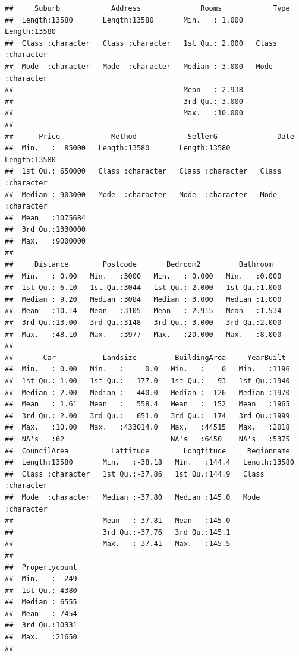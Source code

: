 \documentclass[
]{article}
\begin{document}
\begin{verbatim}
##     Suburb            Address              Rooms            Type          
##  Length:13580       Length:13580       Min.   : 1.000   Length:13580      
##  Class :character   Class :character   1st Qu.: 2.000   Class :character  
##  Mode  :character   Mode  :character   Median : 3.000   Mode  :character  
##                                        Mean   : 2.938                     
##                                        3rd Qu.: 3.000                     
##                                        Max.   :10.000                     
##                                                                           
##      Price            Method            SellerG              Date          
##  Min.   :  85000   Length:13580       Length:13580       Length:13580      
##  1st Qu.: 650000   Class :character   Class :character   Class :character  
##  Median : 903000   Mode  :character   Mode  :character   Mode  :character  
##  Mean   :1075684                                                           
##  3rd Qu.:1330000                                                           
##  Max.   :9000000                                                           
##                                                                            
##     Distance        Postcode       Bedroom2         Bathroom    
##  Min.   : 0.00   Min.   :3000   Min.   : 0.000   Min.   :0.000  
##  1st Qu.: 6.10   1st Qu.:3044   1st Qu.: 2.000   1st Qu.:1.000  
##  Median : 9.20   Median :3084   Median : 3.000   Median :1.000  
##  Mean   :10.14   Mean   :3105   Mean   : 2.915   Mean   :1.534  
##  3rd Qu.:13.00   3rd Qu.:3148   3rd Qu.: 3.000   3rd Qu.:2.000  
##  Max.   :48.10   Max.   :3977   Max.   :20.000   Max.   :8.000  
##                                                                 
##       Car           Landsize         BuildingArea     YearBuilt   
##  Min.   : 0.00   Min.   :     0.0   Min.   :    0   Min.   :1196  
##  1st Qu.: 1.00   1st Qu.:   177.0   1st Qu.:   93   1st Qu.:1940  
##  Median : 2.00   Median :   440.0   Median :  126   Median :1970  
##  Mean   : 1.61   Mean   :   558.4   Mean   :  152   Mean   :1965  
##  3rd Qu.: 2.00   3rd Qu.:   651.0   3rd Qu.:  174   3rd Qu.:1999  
##  Max.   :10.00   Max.   :433014.0   Max.   :44515   Max.   :2018  
##  NA's   :62                         NA's   :6450    NA's   :5375  
##  CouncilArea          Lattitude        Longtitude     Regionname       
##  Length:13580       Min.   :-38.18   Min.   :144.4   Length:13580      
##  Class :character   1st Qu.:-37.86   1st Qu.:144.9   Class :character  
##  Mode  :character   Median :-37.80   Median :145.0   Mode  :character  
##                     Mean   :-37.81   Mean   :145.0                     
##                     3rd Qu.:-37.76   3rd Qu.:145.1                     
##                     Max.   :-37.41   Max.   :145.5                     
##                                                                        
##  Propertycount  
##  Min.   :  249  
##  1st Qu.: 4380  
##  Median : 6555  
##  Mean   : 7454  
##  3rd Qu.:10331  
##  Max.   :21650  
## 
\end{verbatim}
\end{document}
